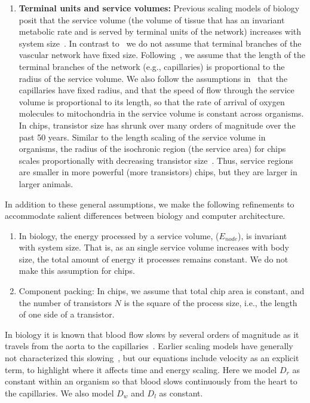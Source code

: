 \documentclass[12pt]{article}
\begin{document}
\begin{enumerate}
\item {\bf Terminal units and service volumes:} Previous scaling models of biology posit that the service volume (the volume of tissue that has an invariant metabolic rate and is served by terminal units of the network) increases with
  system size~\cite{west97, banavar10}.  In contrast to~\cite{west97} we do not assume that terminal branches of the vascular network have fixed size. Following~\cite{banavar10}, we assume that the length of the terminal branches of the network (e.g., capillaries) is
  proportional to the radius of the service volume.  We also follow
  the assumptions in~\cite{banavar10} that the capillaries have fixed
  radius, and that the speed of flow through the service volume is
  proportional to its length, so that the rate of arrival of oxygen
  molecules to mitochondria in the service volume is constant across organisms.   In
  chips, transistor size has shrunk over many orders of
  magnitude over the past 50 years.
Similar to the length scaling of the service volume in organisms, the
radius of the isochronic region (the service area) for chips scales
proportionally with decreasing transistor size~\cite{moses08}. Thus,
service regions are smaller in more powerful (more transistors) chips, but they are larger in larger animals.
\end{enumerate}

In addition to these general assumptions, we make the following
refinements to accommodate salient differences between biology and computer architecture.
\begin{enumerate}
\item In biology, the energy processed by a service volume,
  ($E_{node}$), is invariant with system size. That is, as an single service volume
  increases with body size, the total amount of energy it processes
  remains constant.   We do not make this assumption for chips.

\item Component packing: In chips, we assume that total chip area is constant, and the
  number of transistors $N$ is the square of the process size, i.e.,
  the length of one side of a transistor. 

\end{enumerate}

\noindent 

In biology it is known that blood flow slows by several orders of magnitude as
it travels from the aorta to the capillaries~\cite{west97}.
Earlier scaling models have generally not characterized this
slowing~\cite{west97, banavar10}, but
our equations include velocity as an explicit term, to highlight where it affects time and energy
scaling. Here we model $D_r$ as constant within an organism so that blood slows continuously from the heart to the capillaries. We also model $D_w$ and $D_l$ as constant.
\end{document}
